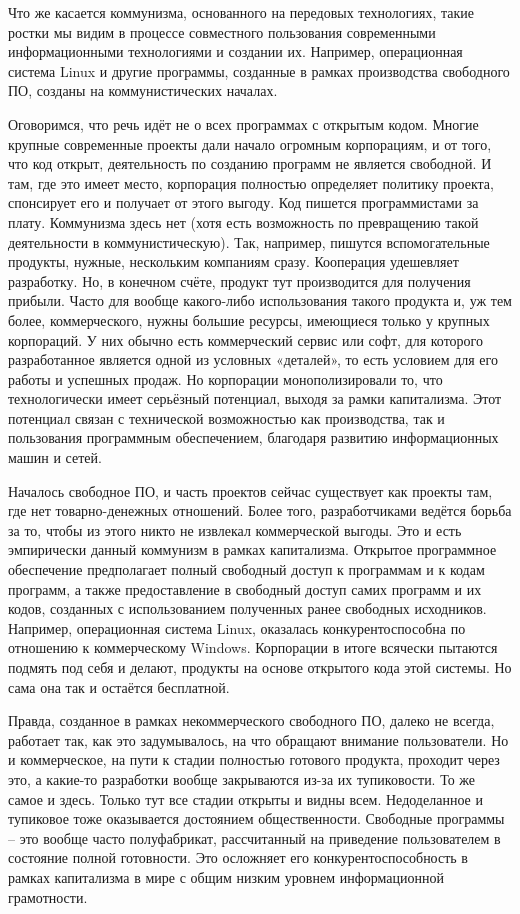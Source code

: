 \documentclass[../main]{subfiles}
\begin{document}
Что же касается коммунизма, основанного на передовых технологиях, такие ростки мы видим в процессе совместного пользования современными информационными технологиями и создании их. Например, операционная система Linux и другие программы, созданные в рамках производства свободного ПО, созданы на коммунистических началах.

Оговоримся, что речь идёт не о всех программах с открытым кодом. Многие крупные современные проекты дали начало огромным корпорациям, и от того, что код открыт, деятельность по созданию программ не является свободной. И там, где это имеет место, корпорация полностью определяет политику проекта, спонсирует его и получает от этого выгоду. Код пишется программистами за плату. Коммунизма здесь нет (хотя есть возможность по превращению такой деятельности в коммунистическую). Так, например, пишутся вспомогательные продукты, нужные, нескольким компаниям сразу. Кооперация удешевляет разработку. Но, в конечном счёте, продукт тут производится для получения прибыли. Часто для вообще какого-либо использования такого продукта и, уж тем более, коммерческого, нужны большие ресурсы, имеющиеся только у крупных корпораций. У них обычно есть коммерческий сервис или софт, для которого разработанное является одной из условных «деталей», то есть условием для его работы и успешных продаж. Но корпорации монополизировали то, что технологически имеет серьёзный потенциал, выходя за рамки капитализма. Этот потенциал связан с технической возможностью как производства, так и пользования программным обеспечением, благодаря развитию информационных машин и сетей.

Началось свободное ПО, и часть проектов сейчас существует как проекты там, где нет товарно-денежных отношений. Более того, разработчиками ведётся борьба за то, чтобы из этого никто не извлекал коммерческой выгоды. Это и есть эмпирически данный коммунизм в рамках капитализма. Открытое программное обеспечение предполагает полный свободный доступ к программам и к кодам программ, а также предоставление в свободный доступ самих программ и их кодов, созданных с использованием полученных ранее свободных исходников. Например, операционная система Linux, оказалась конкурентоспособна по отношению к коммерческому Windows. Корпорации в итоге всячески пытаются подмять под себя и делают, продукты на основе открытого кода этой системы. Но сама она так и остаётся бесплатной.

Правда, созданное в рамках некоммерческого свободного ПО, далеко не всегда, работает так, как это задумывалось, на что обращают внимание пользователи. Но и коммерческое, на пути к стадии полностью готового продукта, проходит через это, а какие-то разработки вообще закрываются из-за их тупиковости. То же самое и здесь. Только тут все стадии открыты и видны всем. Недоделанное и тупиковое тоже оказывается достоянием общественности. Свободные программы – это вообще часто полуфабрикат, рассчитанный на приведение пользователем в состояние полной готовности. Это осложняет его конкурентоспособность в рамках капитализма в мире с общим низким уровнем информационной грамотности.
\end{document}
